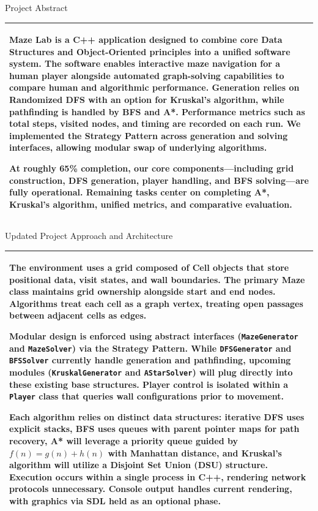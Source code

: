 \documentclass[12pt,a4paper]{article}
\newcommand{\secthead}[2]{%
  {\fontsize{18}{21.9}\selectfont\color{geheading}#1\par}\vspace{1.6pt}%
  {\fontsize{10.5}{14.5}\selectfont\color{gehint}#2\par}%
  \vspace{\secgap}}
\newlength{\secgap}\setlength{\secgap}{5.7pt}
\newcommand{\afterbox}{\vspace{\aftergap}}
\newlength{\aftergap}\setlength{\aftergap}{16pt}
\newenvironment{answerbox}{%
  \noindent\begin{tabular}{|p{485.1pt}|}\hline
  \fontsize{11}{13.6}\selectfont\setlength{\parskip}{4pt}\rule{0pt}{22.5pt}\ignorespaces}{%
  \rule[-16pt]{0pt}{0pt}\\\hline\end{tabular}\par}
\begin{document}
\secthead{Project Abstract }{}
\begin{answerbox}
Maze Lab is a C++ application designed to combine core Data Structures and Object-Oriented principles into a unified software system. The software enables interactive maze navigation for a human player alongside automated graph-solving capabilities to compare human and algorithmic performance. Generation relies on Randomized DFS with an option for Kruskal's algorithm, while pathfinding is handled by BFS and A*. Performance metrics such as total steps, visited nodes, and timing are recorded on each run. We implemented the Strategy Pattern across generation and solving interfaces, allowing modular swap of underlying algorithms. 

At roughly 65\% completion, our core components—including grid construction, DFS generation, player handling, and BFS solving—are fully operational. Remaining tasks center on completing A*, Kruskal's algorithm, unified metrics, and comparative evaluation.
\end{answerbox}
\afterbox

\secthead{Updated Project Approach and Architecture }{}
\begin{answerbox}
The environment uses a grid composed of Cell objects that store positional data, visit states, and wall boundaries. The primary Maze class maintains grid ownership alongside start and end nodes. Algorithms treat each cell as a graph vertex, treating open passages between adjacent cells as edges.

Modular design is enforced using abstract interfaces (\texttt{MazeGenerator} and \texttt{MazeSolver}) via the Strategy Pattern. While \texttt{DFSGenerator} and \texttt{BFSSolver} currently handle generation and pathfinding, upcoming modules (\texttt{KruskalGenerator} and \texttt{AStarSolver}) will plug directly into these existing base structures. Player control is isolated within a \texttt{Player} class that queries wall configurations prior to movement.

Each algorithm relies on distinct data structures: iterative DFS uses explicit stacks, BFS uses queues with parent pointer maps for path recovery, A* will leverage a priority queue guided by $f(n) = g(n) + h(n)$ with Manhattan distance, and Kruskal's algorithm will utilize a Disjoint Set Union (DSU) structure. Execution occurs within a single process in C++, rendering network protocols unnecessary. Console output handles current rendering, with graphics via SDL held as an optional phase.
\end{answerbox}
\end{document}
